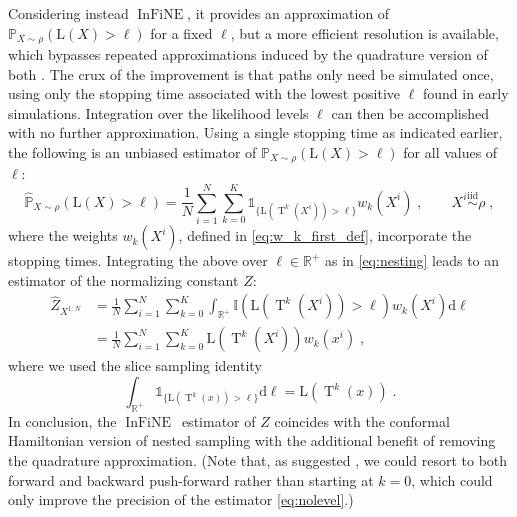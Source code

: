 \documentclass{article}
\def\IFIS{\ensuremath{\operatorname{InFiNE}}}
\def\transfo{\operatorname{T}}
\def\rmd{\operatorname{d}\hspace{-2pt}}
\def\PP{\mathbb{P}}
\def\rmd{\mathrm{d}}
\def\eqsp{\,}
\def\eqsp{\;}
\newcommand{\1}{\mathds{1}}
\newcommand{\indiacc}[1]{\mathds{1}_{\{ #1   \}}}
\def\w{w}
\def\const{Z}
\def\rmd{\mathrm{d}}
\def\likelihood{\mathrm{L}}
\begin{document}
Considering instead \IFIS, it provides an approximation of $\mathbb{P}_{X\sim\rho}(\likelihood(X)> \ell)$ for
a fixed $\ell$, but a more efficient resolution is available, which bypasses repeated approximations induced by the quadrature version of both \cite{skilling2006nested,rotskoff:vanden-eijden:2019}. The crux of the improvement is that paths only need be simulated once, using only the stopping time associated with the lowest positive $\ell$ found in early simulations. Integration over the likelihood levels $\ell$ can then be accomplished with no further approximation. Using a single stopping time as indicated earlier, the following is an unbiased estimator of $\PP_{X\sim\rho}(\likelihood(X)> \ell)$ for all values of $\ell$: 
\begin{equation}
\widehat{\PP}_{X\sim\rho}(\likelihood(X)> \ell) =\frac{1}{N} \sum_{i=1}^N 
 \sum_{k=0}^K \indiacc{\likelihood(\transfo^{k}(X^i))> \ell} \w_k(X^i)\eqsp,
 \qquad
X^{i}\stackrel{\text{iid}}{\sim}\rho\eqsp,
\end{equation}
where the weights $\w_k(X^i)$, defined in \eqref{eq:w_k_first_def}, incorporate the stopping times. Integrating the above over $\ell\in\mathbb{R}^+$ as in \eqref{eq:nesting} leads to an estimator of the normalizing constant $\const$:
\begin{align}\label{eq:nolevel}
\widehat{\const}_{X^{1:N}} &=\frac{1}{N}\sum_{i=1}^{N} \sum_{k=0}^{K}  \int_{\mathbb{R}^+} 
 \mathbb{I}(\likelihood(\transfo^{k}(X^i))> \ell) \w_k(X^i) \rmd \ell\nonumber\\
 &= \frac{1}{N}\sum_{i=1}^{N} 
 \sum_{k=0}^K\likelihood(\transfo^k(X^i)) \w_k(x^i)\eqsp,
\end{align}
where we used the slice sampling identity 
\[ 
 \int_{\mathbb{R}^+} \indiacc{\likelihood(\transfo^{k}(x))> \ell} \rmd \ell=\likelihood(\transfo^{k}(x))\eqsp.
\]
In conclusion, the \IFIS~estimator of $\const$ coincides with the conformal Hamiltonian version of nested sampling with the additional benefit of removing the quadrature approximation.
(Note that, as suggested , we could resort to both forward and backward push-forward rather than starting at $k=0$, which could only improve the precision of the estimator \eqref{eq:nolevel}.)
\end{document}
